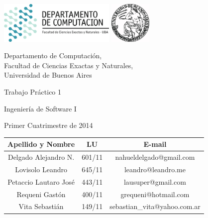 \documentclass[a4paper, 10pt, twoside]{article}
\begin{document}


\thispagestyle{caratula}

\begin{center}

\includegraphics[height=2cm]{DC.png} 
\hfill
\includegraphics[height=2cm]{UBA.jpg} 

\vspace{2cm}

Departamento de Computación,\\
Facultad de Ciencias Exactas y Naturales,\\
Universidad de Buenos Aires

\vspace{4cm}

\begin{Huge}
Trabajo Práctico 1
\end{Huge}

\vspace{0.5cm}

\begin{Large}
Ingeniería de Software I
\end{Large}

\vspace{1cm}

Primer Cuatrimestre de 2014

\vspace{4cm}

\begin{tabular}{|c|c|c|}
\hline
Apellido y Nombre & LU & E-mail\\
\hline
Delgado Alejandro N.  & 601/11 & nahueldelgado@gmail.com\\
Lovisolo Leandro      & 645/11 & leandro@leandro.me\\
Petaccio Lautaro José & 443/11 & lausuper@gmail.com\\
Requeni Gastón        & 400/11 & grequeni@hotmail.com\\
Vita Sebastián        & 149/11 & sebastian\_vita@yahoo.com.ar\\
\hline
\end{tabular}

\end{center}
\end{document}
